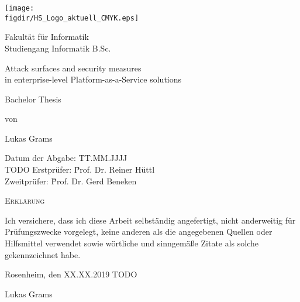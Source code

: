 \begin{titlepage}

\sffamily

\raggedleft

\vspace*{-2cm}

\texttt{[image: \\figdir/HS\_Logo\_aktuell\_CMYK.eps]}

\vfill

\centering
\Huge
Fakultät für Informatik  \vspace{0.5cm}\\
\Large
Studiengang Informatik B.Sc.

\Huge
Attack surfaces and security measures \\
in enterprise-level Platform-as-a-Service solutions

\vspace{2cm}

\Large
Bachelor Thesis


\vspace{1.5cm}

\Large
von

\vspace{0.5cm}

\LARGE
Lukas Grams

\vspace{1cm}

\flushleft
 \Large
\vspace*{\fill}

\begin{tabbing}
Datum der Abgabe: \= TT.MM.JJJJ \\ TODO
Erstprüfer: \= Prof. Dr. Reiner Hüttl \\
Zweitprüfer: \= Prof. Dr. Gerd Beneken \\
\end{tabbing}

\end{titlepage}


\cleardoubleemptypage

{
\large
\thispagestyle{empty}
\vspace*{\fill}

\noindent
\textsc{Erklärung}

\medskip

\noindent
Ich versichere, dass ich diese Arbeit selbständig
angefertigt, nicht anderweitig für Prüfungszwecke
vorgelegt, keine anderen als die angegebenen Quellen
oder Hilfsmittel verwendet sowie wörtliche und
sinngemäße Zitate als solche gekennzeichnet habe.

\bigskip

\noindent
Rosenheim, den XX.XX.2019 TODO

\vspace*{2cm}

\noindent
Lukas Grams
}